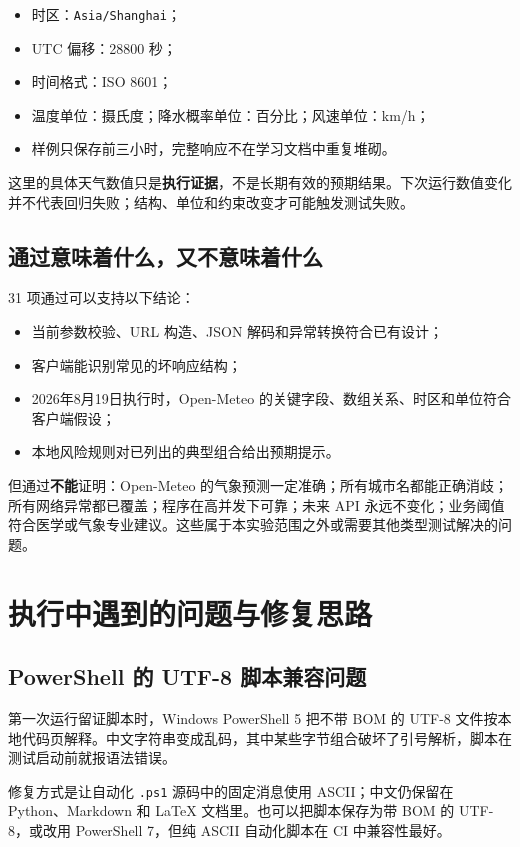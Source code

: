 \documentclass[UTF8,zihao=-4,a4paper]{ctexart}
\newcommand{\term}[1]{\textbf{#1}}
\newcommand{\code}[1]{\texttt{#1}}
\newcommand{\risk}[1]{\textcolor{CodeRed}{\textbf{#1}}}
\begin{document}
\begin{itemize}
  \item 时区：\code{Asia/Shanghai}；
  \item UTC 偏移：28800 秒；
  \item 时间格式：ISO 8601；
  \item 温度单位：摄氏度；降水概率单位：百分比；风速单位：km/h；
  \item 样例只保存前三小时，完整响应不在学习文档中重复堆砌。
\end{itemize}

这里的具体天气数值只是\term{执行证据}，不是长期有效的预期结果。下次运行数值变化并不代表回归失败；结构、单位和约束改变才可能触发测试失败。

\subsection{通过意味着什么，又不意味着什么}

31 项通过可以支持以下结论：

\begin{itemize}
  \item 当前参数校验、URL 构造、JSON 解码和异常转换符合已有设计；
  \item 客户端能识别常见的坏响应结构；
  \item 2026年8月19日执行时，Open-Meteo 的关键字段、数组关系、时区和单位符合客户端假设；
  \item 本地风险规则对已列出的典型组合给出预期提示。
\end{itemize}

但通过\risk{不能}证明：Open-Meteo 的气象预测一定准确；所有城市名都能正确消歧；所有网络异常都已覆盖；程序在高并发下可靠；未来 API 永远不变化；业务阈值符合医学或气象专业建议。这些属于本实验范围之外或需要其他类型测试解决的问题。

\section{执行中遇到的问题与修复思路}

\subsection{PowerShell 的 UTF-8 脚本兼容问题}

第一次运行留证脚本时，Windows PowerShell 5 把不带 BOM 的 UTF-8 文件按本地代码页解释。中文字符串变成乱码，其中某些字节组合破坏了引号解析，脚本在测试启动前就报语法错误。

修复方式是让自动化 \code{.ps1} 源码中的固定消息使用 ASCII；中文仍保留在 Python、Markdown 和 LaTeX 文档里。也可以把脚本保存为带 BOM 的 UTF-8，或改用 PowerShell 7，但纯 ASCII 自动化脚本在 CI 中兼容性最好。
\end{document}
